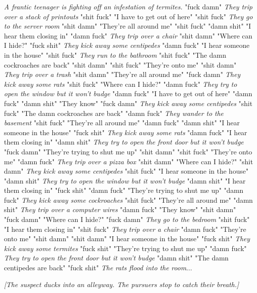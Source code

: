 \documentclass{report}
\begin{document}
\textit{A frantic teenager is fighting off an infestation of termites.} "fuck damn" \textit{They trip over a stack of printouts} "shit fuck" "I have to get out of here" "shit fuck" \textit{They go to the server room} "shit damn" "They're all around me" "shit fuck" \textit{} "damn shit" "I hear them closing in" "damn fuck" \textit{They trip over a chair} "shit damn" "Where can I hide?" "fuck shit" \textit{They kick away some centipedes} "damn fuck" "I hear someone in the house" "shit fuck" \textit{They run to the bathroom} "shit fuck" "The damn cockroaches are back" "shit damn" \textit{} "shit fuck" "They're onto me" "shit damn" \textit{They trip over a trash} "shit damn" "They're all around me" "fuck damn" \textit{They kick away some rats} "shit fuck" "Where can I hide?" "damn fuck" \textit{They try to open the window but it won't budge} "damn fuck" "I have to get out of here" "damn fuck" \textit{} "damn shit" "They know" "fuck damn" \textit{They kick away some centipedes} "shit fuck" "The damn cockroaches are back" "damn fuck" \textit{They wander to the basement} "shit fuck" "They're all around me" "damn fuck" \textit{} "damn shit" "I hear someone in the house" "fuck shit" \textit{They kick away some rats} "damn fuck" "I hear them closing in" "damn shit" \textit{They try to open the front door but it won't budge} "fuck damn" "They're trying to shut me up" "shit damn" \textit{} "shit fuck" "They're onto me" "damn fuck" \textit{They trip over a pizza box} "shit damn" "Where can I hide?" "shit damn" \textit{They kick away some centipedes} "shit fuck" "I hear someone in the house" "damn shit" \textit{They try to open the window but it won't budge} "damn shit" "I hear them closing in" "fuck shit" \textit{} "damn fuck" "They're trying to shut me up" "damn fuck" \textit{They kick away some cockroaches} "shit fuck" "They're all around me" "damn shit" \textit{They trip over a computer wires} "damn fuck" "They know" "shit damn" \textit{} "fuck damn" "Where can I hide?" "fuck damn" \textit{They go to the bedroom} "shit fuck" "I hear them closing in" "shit fuck" \textit{They trip over a chair} "damn fuck" "They're onto me" "shit damn" \textit{} "shit damn" "I hear someone in the house" "fuck shit" \textit{They kick away some termites} "fuck shit" "They're trying to shut me up" "damn fuck" \textit{They try to open the front door but it won't budge} "damn shit" "The damn centipedes are back" "fuck shit" \textit{} \textit{The rats flood into the room}...

\textit{[The suspect ducks into an alleyway. The pursuers stop to catch their breath.]}
\end{document}
